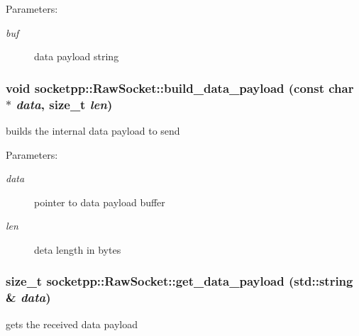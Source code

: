 \begin{Desc}
\item[Parameters:]
\begin{description}
\item[{\em buf}]data payload string \end{description}
\end{Desc}
\hypertarget{classsocketpp_1_1RawSocket_99ea2415525269d24ba088a58d62abdd}{
\subsubsection[{build\_\-data\_\-payload}]{\setlength{\rightskip}{0pt plus 5cm}void socketpp::RawSocket::build\_\-data\_\-payload (const char $\ast$ {\em data}, \/  size\_\-t {\em len})}}
\label{classsocketpp_1_1RawSocket_99ea2415525269d24ba088a58d62abdd}


builds the internal data payload to send 

\begin{Desc}
\item[Parameters:]
\begin{description}
\item[{\em data}]pointer to data payload buffer \item[{\em len}]deta length in bytes \end{description}
\end{Desc}
\hypertarget{classsocketpp_1_1RawSocket_de47c63d60cba25d1ae82f242851610d}{
\subsubsection[{get\_\-data\_\-payload}]{\setlength{\rightskip}{0pt plus 5cm}size\_\-t socketpp::RawSocket::get\_\-data\_\-payload (std::string \& {\em data})}}
\label{classsocketpp_1_1RawSocket_de47c63d60cba25d1ae82f242851610d}


gets the received data payload 

